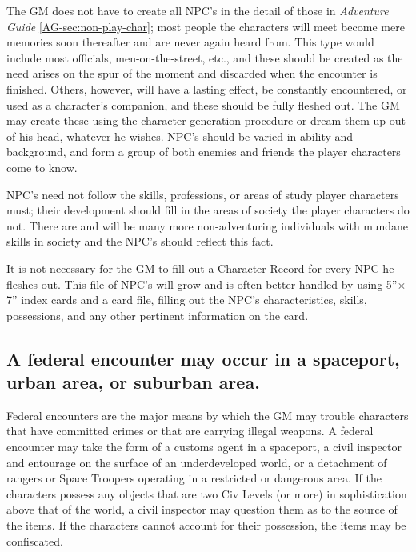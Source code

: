 The GM does not have to create all NPC's in the detail of those in
\emph{Adventure Guide} \ref{AG-sec:non-play-char}; most people the characters will meet become mere
memories soon thereafter and are never again heard from. This type
would include most officials, men-on-the-street, etc., and these
should be created as the need arises on the spur of the moment and
discarded when the encounter is finished. Others, however, will have a
lasting effect, be constantly encountered, or used as a character's
companion, and these should be fully fleshed out. The GM may create
these using the character generation procedure or dream them up out of
his head, whatever he wishes. NPC's should be varied in ability and
background, and form a group of both enemies and friends the player
characters come to know.

NPC's need not follow the skills, professions, or areas of study
player characters must; their development should fill in the areas of
society the player characters do not. There are and will be many more
non-adventuring individuals with mundane skills in society and the
NPC's should reflect this fact.

It is not necessary for the GM to fill out a Character Record for
every NPC he fleshes out. This file of NPC's will grow and is often
better handled by using 5''$\times$7'' index cards and a card file,
filling out the NPC's characteristics, skills, possessions, and any
other pertinent information on the card.

\subsection[Federal Encounters]{A federal encounter may occur in a
  spaceport, urban area, or suburban area.} 
\label{sec:federal-encounters}



Federal encounters are the major means by which the GM may trouble
characters that have committed crimes or that are carrying illegal
weapons. A federal encounter may take the form of a customs agent in a
spaceport, a civil inspector and entourage on the surface of an
underdeveloped world, or a detachment of rangers or Space Troopers
operating in a restricted or dangerous area. If the characters possess
any objects that are two Civ Levels (or more) in sophistication above
that of the world, a civil inspector may question them as to the
source of the items. If the characters cannot account for their
possession, the items may be confiscated.

